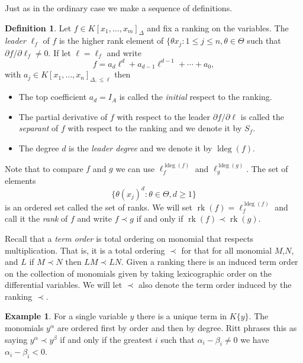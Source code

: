 \documentclass[12pt]{book}
\numberwithin{equation}{section}
\theoremstyle{definition}
\newtheorem{definition}[theorem]{Definition}
\newtheorem{example}[theorem]{Example}
\theoremstyle{remark}
\newcommand{\ldeg}{\operatorname{ldeg}}
\newcommand{\rk}{\operatorname{rk}}
\begin{document}
Just as in the ordinary case we make a sequence of definitions.
\begin{definition}
	Let $f \in K[x_1,\ldots,x_m]_{\Delta}$ and fix a ranking on the variables. 
	The \emph{leader} $\ell_f$ of $f$ is the higher rank element of $\lbrace \theta x_j \colon 1\leq j \leq n, \theta \in \Theta$ such that $\partial f/\partial \ell_f\neq 0$. 
	If let $\ell = \ell_f$ and write 
	$$f = a_d \ell^d + a_{d-1} \ell^{d-1} + \cdots + a_0,$$
	with $a_j \in K[x_1,\ldots,x_n]_{\Delta, \leq \ell}$ then
	\begin{itemize}[topsep=0pt]	 
		\item  The top coefficient $a_d = I_A$ is called the \emph{initial} respect to the ranking.
		\item The partial derivative of $f$ with respect to the leader $\partial f/\partial \ell$ is called the \emph{separant} of $f$ with respect to the ranking and we denote it by $S_f$.
		\item The degree $d$ is the \emph{leader degree} and we denote it by $\ldeg(f)$.
	\end{itemize}
\end{definition}


Note that to compare $f$ and $g$ we can use $\ell_f^{\ldeg(f)}$ and $\ell_g^{\ldeg(g)}$.
The set of elements 
 $$ \lbrace \theta(x_j)^d \colon \theta \in \Theta, d\geq 1 \rbrace $$
is an ordered set called the set of ranks. 
We will set $\rk(f) = \ell_f^{\ldeg(f)}$ and call it the \emph{rank} of $f$ and write $f\prec g$ if and only if $\rk(f) \prec \rk(g)$.

Recall that a \emph{term order} is total ordering on monomial that respects multiplication. 
That is, it is a total ordering $\prec$ for that for all monomial $M$,$N$, and $L$ if $M\prec N$ then $LM \prec LN$. 
Given a ranking there is an induced term order on the collection of monomials given by taking lexicographic order on the differential variables. 
We will let $\prec$ also denote the term order induced by the ranking $\prec$. 

\begin{example}
	For a single variable $y$ there is a unique term in $K\lbrace y \rbrace$. 
	The monomials $y^{\alpha}$ are ordered first by order and then by degree. 
	Ritt phrases this as saying $y^{\alpha} \prec y^{\beta}$ if and only if the greatest $i$ such that $\alpha_i - \beta_i \neq 0$ we have $\alpha_i -\beta_i <0$.  
\end{example}
\end{document}
